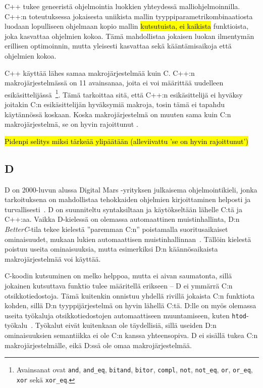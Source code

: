 C++ tukee geneeristä ohjelmointia luokkien
yhteydessä malliohjelmoinnilla. C++:n
toteutuksessa jokaisesta uniikista mallin tyyppiparametrikombinaatiosta luodaan
lopulliseen ohjelmaan kopio mallin \hl{kutsutuista, ei kaikista} funktioista,
joka kasvattaa ohjelmien kokoa. Tämä mahdollistaa jokaisen luokan
ilmentymän erillisen optimoinnin, mutta yleisesti kasvattaa
sekä kääntämisaikoja että ohjelmien kokoa.

C++ käyttää lähes samaa makrojärjestelmää kuin C. C++:n makrojärjestelmässä on
11 avainsanaa, joita ei voi määrittää uudelleen
esikäsittelijässä~\citep[luku~19.2]{CPP17}\footnote{ Avainsanat ovat
\texttt{and}, \texttt{and\_eq}, \texttt{bitand}, \texttt{bitor},
\texttt{compl}, \texttt{not}, \texttt{not\_eq}, \texttt{or}, \texttt{or\_eq},
\texttt{xor} sekä \texttt{xor\_eq}. }. Tämä tarkoittaa sitä, että C++:n
esikäsittelijä ei hyväksy joitakin C:n esikäsittelijän hyväksymiä makroja,
tosin tämä ei tapahdu käytännössä koskaan. Koska makrojärjestelmä on muuten
sama kuin C:n makrojärjestelmä, se on hyvin rajoittunut \citep[luku~19]{CPP17}.

\hl{Pidenpi selitys miksi tärkeää ylipäätään (alleviivattu 'se on hyvin
rajoittunut')}

\subsection{D}

D on 2000-luvun alussa Digital Mars -yrityksen julkaisema ohjelmointikieli,
jonka tarkoituksena on mahdollistaa tehokkaiden ohjelmien kirjoittaminen
helposti ja turvallisesti~\citep{dhistory}. D on suunniteltu syntaksiltaan ja
käytökseltään lähelle C:tä ja C++:aa. Vaikka D-kielessä on olemassa
automaattinen muistinhallinta, D:n \emph{BetterC}-tila tekee kielestä
''paremman C:n'' poistamalla suoritusaikaiset ominaisuudet, mukaan lukien
automaattisen muistinhallinnan~\citep{dbetterc}. Tällöin kielestä poistuu
useita ominaisuuksia, mutta esimerkiksi D:n käännösaikaista makrojärjestelmää
voi käyttää.

C-koodin kutsuminen on melko helppoa, mutta ei aivan saumatonta, sillä jokainen
kutsuttava funktio tulee määritellä erikseen -- D ei ymmärrä C:n
otsikkotiedostoja. Tämä kuitenkin onnistuu yhdellä rivillä jokaista C:n
funktiota kohden, sillä D:n tyyppijärjestelmä on hyvin lähellä C:tä. D:lle on
myös olemassa useita työkaluja otsikkotiedostojen automaattiseen muuntamiseen,
kuten \texttt{htod}-työkalu~\citep{htod}. Työkalut eivät kuitenkaan ole
täydellisiä, sillä useiden D:n ominaisuuksien semantiikka ei ole C:n kanssa
yhteensopiva. D ei sisällä tukea C:n makrojärjestelmälle, eikä D:ssä ole
omaa makrojärjestelmää.

